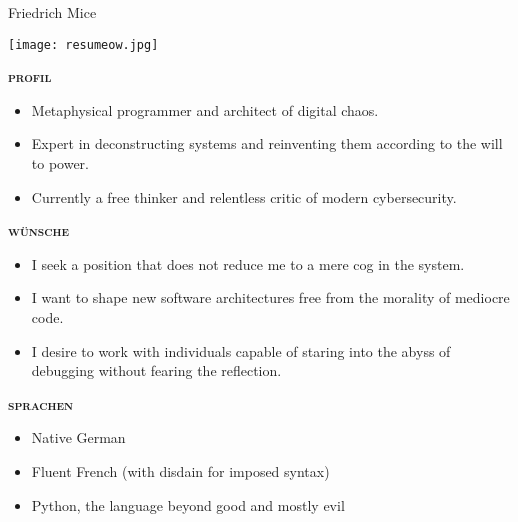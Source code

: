 \documentclass[11pt, a4paper]{article}
\newcommand{\headleft}[1]{\vspace*{2ex}\textsc{\textbf{\textbf{#1}}}\par%
    \vspace*{-1.5ex}\hrulefill\par\vspace*{0.7ex}}
\begin{document}
\setlength{\topskip}{0pt}
\setlength{\parindent}{0pt}
\setlength{\parskip}{0pt}
\setlength{\fboxsep}{0pt}
\pagestyle{empty}
\raggedbottom

\begin{minipage}[t]{0.33\textwidth} %
\colorbox{cvblue}{\begin{minipage}[t][5mm][t]{\textwidth}\null\hfill\null\end{minipage}}

\vspace{-.2ex} %
\colorbox{cvblue}{\color{white}  %
\textwidth\relax%
\begin{minipage}[t][293mm][t]{0.82\textwidth}
\raggedright
\vspace*{2.0ex}
\begin{center}
  \Large Friedrich Mice
\end{center}
\normalsize 

\null\hfill\texttt{[image: resumeow.jpg]}\hfill\null

\vspace*{0.1ex} %

\headleft{profil}
\begin{itemize}
	\item Metaphysical programmer and architect of digital chaos.
	\item Expert in deconstructing systems and reinventing them according to the will to power.
	\item Currently a free thinker and relentless critic of modern cybersecurity.
\end{itemize}

\headleft{wünsche}
\begin{itemize}
	\item I seek a position that does not reduce me to a mere cog in the system.
	\item I want to shape new software architectures free from the morality of mediocre code.
	\item I desire to work with individuals capable of staring into the abyss of debugging without fearing the reflection.
\end{itemize}

\headleft{sprachen}
\begin{itemize}
	\item Native German
	\item Fluent French (with disdain for imposed syntax)
	\item Python, the language beyond good and mostly evil
\end{itemize}


\end{minipage}}
\end{minipage}
\end{document}
